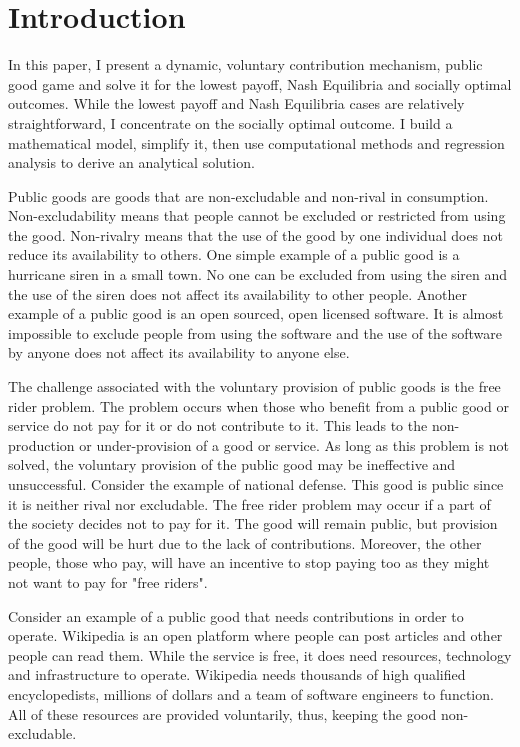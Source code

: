 \section{Introduction}

	In this paper, I present a dynamic, voluntary contribution mechanism, public good game and solve it for the lowest payoff, Nash Equilibria and socially optimal outcomes. While the lowest payoff and Nash Equilibria cases are relatively straightforward, I concentrate on the socially optimal outcome. I build a mathematical model, simplify it, then use computational methods and regression analysis to derive an analytical solution.

	Public goods are goods that are non-excludable and non-rival in consumption. Non-excludability means that people cannot be excluded or restricted from using the good. Non-rivalry means that the use of the good by one individual does not reduce its availability to others. One simple example of a public good is a hurricane siren in a small town. No one can be excluded from using the siren and the use of the siren does not affect its availability to other people. Another example of a public good is an open sourced, open licensed software. It is almost impossible to exclude people from using the software and the use of the software by anyone does not affect its availability to anyone else.
	
	The challenge associated with the voluntary provision of public goods is the free rider problem. The problem occurs when those who benefit from a public good or service do not pay for it or do not contribute to it. This leads to the non-production or under-provision of a good or service. As long as this problem is not solved, the voluntary provision of the public good may be ineffective and unsuccessful. Consider the example of national defense. This good is public since it is neither rival nor excludable. The free rider problem may occur if a part of the society decides not to pay for it. The good will remain public, but provision of the good will be hurt due to the lack of contributions. Moreover, the other people, those who pay, will have an incentive to stop paying too as they might not want to pay for "free riders".
	
	Consider an example of a public good that needs contributions in order to operate. Wikipedia is an open platform where people can post articles and other people can read them. While the service is free, it does need resources, technology and infrastructure to operate. Wikipedia needs thousands of high qualified encyclopedists, millions of dollars and a team of software engineers to function. All of these resources are provided voluntarily, thus, keeping the good non-excludable.
	
